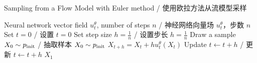 \begin{algorithm}[h]
\caption{Sampling from a Flow Model with Euler method / 使用欧拉方法从流模型采样}
\label{alg:sampling_flow_model}
\begin{algorithmic}[1]
\REQUIRE Neural network vector field $u_t^\theta$, number of steps $n$ / 神经网络向量场 $u_t^\theta$，步数 $n$
\STATE Set $t=0$ / 设置 $t=0$
\STATE Set step size $h=\frac{1}{n}$ / 设置步长 $h=\frac{1}{n}$
\STATE Draw a sample $X_0\sim p_{\rm{init}}$ / 抽取样本 $X_0\sim p_{\rm{init}}$
    \STATE $X_{t+h} = X_{t} + h u_t^\theta(X_t)$
    \STATE Update $t\leftarrow t+h$ / 更新 $t\leftarrow t+h$
\ENDFOR
\RETURN $X_1$
\end{algorithmic}
\end{algorithm}




